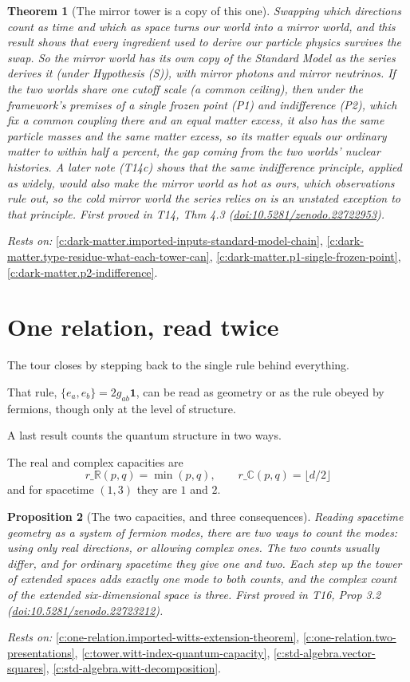 \documentclass[11pt]{article}
\newtheorem{theorem}{Theorem}[section]
\newtheorem{proposition}[theorem]{Proposition}
\theoremstyle{definition}
\theoremstyle{plain}
\providecommand{\C}{}\renewcommand{\C}{\mathbb{C}}
\providecommand{\R}{}\renewcommand{\R}{\mathbb{R}}
\begin{document}
\begin{theorem}[The mirror tower is a copy of this one]\label{c:dark-matter.mirror-tower-copy-one}
Swapping which directions count as time and which as space turns our world into a mirror world, and this result shows that every ingredient used to derive our particle physics survives the swap. So the mirror world has its own copy of the Standard Model as the series derives it (under Hypothesis (S)), with mirror photons and mirror neutrinos. If the two worlds share one cutoff scale (a common ceiling), then under the framework's premises of a single frozen point (P1) and indifference (P2), which fix a common coupling there and an equal matter excess, it also has the same particle masses and the same matter excess, so its matter equals our ordinary matter to within half a percent, the gap coming from the two worlds' nuclear histories. A later note (T14c) shows that the same indifference principle, applied as widely, would also make the mirror world as hot as ours, which observations rule out, so the cold mirror world the series relies on is an unstated exception to that principle.
\emph{First proved in} T14, Thm 4.3 (\href{https://doi.org/10.5281/zenodo.22722953}{doi:10.5281/zenodo.22722953}).
\end{theorem}
\noindent\emph{Rests on:} \ref{c:dark-matter.imported-inputs-standard-model-chain}, \ref{c:dark-matter.type-residue-what-each-tower-can}, \ref{c:dark-matter.p1-single-frozen-point}, \ref{c:dark-matter.p2-indifference}.

\section{One relation, read twice}

The tour closes by stepping back to the single rule behind everything.

That rule, $\{e_{a}, e_{b}\} = 2g_{ab}\mathbf{1}$, can be read as geometry or as the rule obeyed by fermions, though only at the level of structure.

A last result counts the quantum structure in two ways.

The real and complex capacities are \[ r\_{\R}(p,q) = \min(p,q), \qquad r\_{\C}(p,q) = \lfloor d/2 \rfloor \] and for spacetime $(1,3)$ they are $1$ and $2$.

\begin{proposition}[The two capacities, and three consequences]\label{c:one-relation.two-capacities-three-consequences}
Reading spacetime geometry as a system of fermion modes, there are two ways to count the modes: using only real directions, or allowing complex ones. The two counts usually differ, and for ordinary spacetime they give one and two. Each step up the tower of extended spaces adds exactly one mode to both counts, and the complex count of the extended six-dimensional space is three.
\emph{First proved in} T16, Prop 3.2 (\href{https://doi.org/10.5281/zenodo.22723212}{doi:10.5281/zenodo.22723212}).
\end{proposition}
\noindent\emph{Rests on:} \ref{c:one-relation.imported-witts-extension-theorem}, \ref{c:one-relation.two-presentations}, \ref{c:tower.witt-index-quantum-capacity}, \ref{c:std-algebra.vector-squares}, \ref{c:std-algebra.witt-decomposition}.
\end{document}
